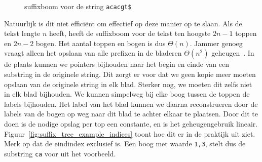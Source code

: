 \begin{figure}[H]
    \center
    \caption{suffixboom voor de string \texttt{acacgt\$}}\label{fig:suffix_tree_example}

\end{figure}

Natuurlijk is dit niet efficiënt om effectief op deze manier op te slaan.
Als de tekst lengte $n$ heeft, heeft de suffixboom voor de tekst ten hoogste $2n - 1$ toppen en $2n - 2$ bogen.
Het aantal toppen en bogen is dus $\Theta(n)$.
Jammer genoeg vraagt alleen het opslaan van alle prefixen in de bladeren $\Theta(n^2)$ geheugen~\cite{AD3_ukkonen}.
In de plaats kunnen we pointers bijhouden naar het begin en einde van een substring in de originele string.
Dit zorgt er voor dat we geen kopie meer moeten opslaan van de originele string in elk blad.
Sterker nog, we moeten dit zelfs niet in elk blad bijhouden.
We kunnen simpelweg bij elke boog tussen de toppen de labels bijhouden.
Het label van het blad kunnen we daarna reconstrueren door de labels van de bogen op weg naar dit blad te achter elkaar te plaatsen.
Door dit te doen is de nodige opslag per top een constante, en is het geheugengebruik lineair.
Figuur~\ref{fig:suffix_tree_example_indices} toont hoe dit er in de praktijk uit ziet.
Merk op dat de eindindex exclusief is.
Een boog met waarde \texttt{1,3}, stelt dus de substring \texttt{ca} voor uit het voorbeeld.


